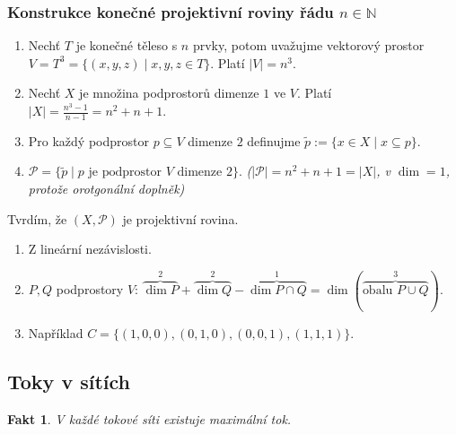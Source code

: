 \documentclass[10pt,a4paper]{article}
\newtheorem{fakt}{Fakt}
\newcommand{\N}{{\mathbb{N}}}       %
\newcommand{\Pp}{{\mathcal{P}}}     %
\begin{document}
\subsubsection*{Konstrukce konečné projektivní roviny řádu $n\in \N$}
\begin{enumerate}[label=(\arabic*)]
    \item Nechť $T$ je konečné těleso s $n$ prvky, potom uvažujme vektorový prostor $V = T^3 = \{(x,y,z) \mid x,y,z \in T\}$. Platí $|V| = n^3$.
    \item Nechť $X$ je množina podprostorů dimenze $1$ ve $V$. Platí $|X| = \frac{n^3-1}{n-1} = n^2+n+1$.
    \item Pro každý podprostor $p\subseteq V$ dimenze $2$ definujme $\tilde{p}:=\{x \in X \mid x \subseteq p\}$.
    \item $\Pp = \{\tilde{p} \mid p \text{ je podprostor } V \text{ dimenze } 2\}$. \textit{($|\Pp|=n^2+n+1 = |X|$, v $\dim = 1$, protože orotgonální doplněk)}
\end{enumerate}

Tvrdím, že $(X, \Pp)$ je projektivní rovina.
\begin{enumerate}[label=(\roman*)]
    \item Z lineární nezávislosti.
    \item $P,Q$ podprostory $V$: $\overbrace{\dim P}^{2} + \overbrace{\dim Q}^{2} - \overbrace{\dim P\cap Q}^{1} = \dim (\overbrace{\text{obalu } P\cup Q}^{3})$.
    \item Například $C=\{(1,0,0), (0,1,0), (0,0,1), (1,1,1)\}$.
\end{enumerate}

\newpage
\subsection{Toky v sítích}

\begin{fakt}
    V každé tokové síti existuje maximální tok.
\end{fakt}
\end{document}
